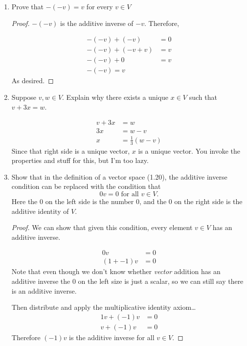 \begin{enumerate}
    \item[1] Prove that $-(-v) = v$ for every $v \in V$

    \begin{proof}
        $-(-v)$ is the additive inverse of $-v$. Therefore,
        
        \begin{align*}
            -(-v) + (-v) &= 0 \\
            -(-v) + (-v + v) &= v \\
            -(-v) + 0 &= v \\
            -(-v) = v 
        \end{align*}
        As desired.
    \end{proof}

    \item[3] Suppose $v, w \in V$. Explain why there exists a unique $x \in V$ such that $v + 3x = w$.
    
    \begin{align*}
        v + 3x &= w \\
        3x &= w - v \\ 
        x &= \frac{1}{3}(w - v)
    \end{align*}
    Since that right side is a unique vector, $x$ is a unique vector. You invoke the properties and stuff for this, but I'm too lazy.

    \item[5] Show that in the definition of a vector space (1.20), the additive inverse
condition can be replaced with the condition that
$$0v = 0 \text{ for all } v \in V.$$ 
Here the 0 on the left side is the number 0, and the 0 on the right side is the
additive identity of $V$.

    \begin{proof}
        We can show that given this condition, every element $v \in V$ has an additive inverse. 

        \begin{align*}
            0v &= 0 \\
            (1 + -1)v &= 0
        \end{align*}
        Note that even though we don't know whether \emph{vector} addition has an additive inverse the 0 on the left size is just a scalar, so we can still say there is an additive inverse. 


        Then distribute and apply the multiplicative identity axiom\dots
        \begin{align*}
            1v + (-1)v &= 0 \\
            v + (-1)v &= 0
        \end{align*}
        Therefore $(-1)v$ is the additive inverse for all $v \in V$.
    \end{proof}
    

\end{enumerate}
